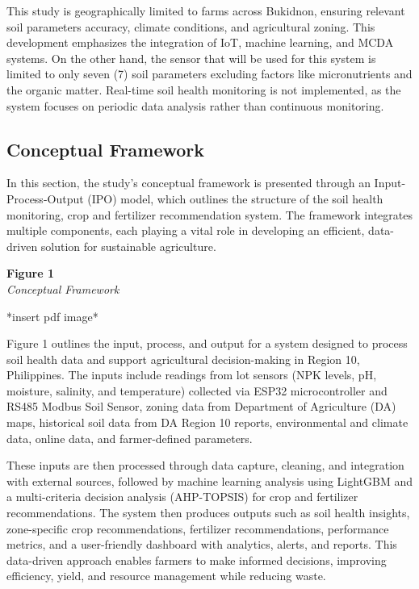 \begin{doublespace}
This study is geographically limited to farms across Bukidnon, ensuring relevant soil parameters accuracy, climate conditions, and agricultural zoning. This development emphasizes the integration of IoT, machine learning, and MCDA systems. On the other hand, the sensor that will be used for this system is limited to only seven (7) soil parameters excluding factors like micronutrients and the organic matter. Real-time soil health monitoring is not implemented, as the system focuses on periodic data analysis rather than continuous monitoring.

\subsection{Conceptual Framework}

In this section, the study’s conceptual framework is presented through an Input-Process-Output (IPO) model, which outlines the structure of the soil health monitoring, crop and fertilizer recommendation system. The framework integrates multiple components, each playing a vital role in developing an efficient, data-driven solution for sustainable agriculture.

\textbf{Figure 1}\\
\textit{Conceptual Framework}

*insert pdf image*

Figure 1 outlines the input, process, and output for a system designed to process soil health data and support agricultural decision-making in Region 10, Philippines. The inputs include  readings from lot sensors (NPK levels, pH, moisture, salinity, and temperature) collected via ESP32 microcontroller and RS485 Modbus Soil Sensor, zoning data from Department of Agriculture (DA) maps, historical soil data from DA Region 10 reports, environmental and climate data, online data, and farmer-defined parameters.

These inputs are then processed through data capture, cleaning, and integration with external sources, followed by machine learning analysis using LightGBM and a multi-criteria decision analysis (AHP-TOPSIS) for crop and fertilizer recommendations. The system then produces outputs such as soil health insights, zone-specific crop recommendations, fertilizer recommendations, performance metrics, and a user-friendly dashboard with  analytics, alerts, and reports. This data-driven approach enables farmers to make informed decisions, improving efficiency, yield, and resource management while reducing waste.


\end{doublespace}
